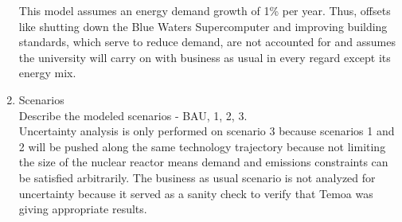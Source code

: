 \begin{enumerate}
  This model assumes an energy demand growth of 1\% per year. Thus, offsets like
  shutting down the Blue Waters Supercomputer and improving building standards,
  which serve to reduce demand, are not accounted for and assumes the university
  will carry on with business as usual in every regard except its energy mix.
  \item Scenarios \\
  Describe the modeled scenarios - BAU, 1, 2, 3. \\
  Uncertainty analysis is only performed on scenario 3 because scenarios 1 and 2
  will be pushed along the same technology trajectory because not limiting the
  size of the nuclear reactor means demand and emissions constraints can be
  satisfied arbitrarily. The business as usual scenario is not analyzed for
  uncertainty because it served as a sanity check to verify that Temoa was giving
  appropriate results.
\end{enumerate}
